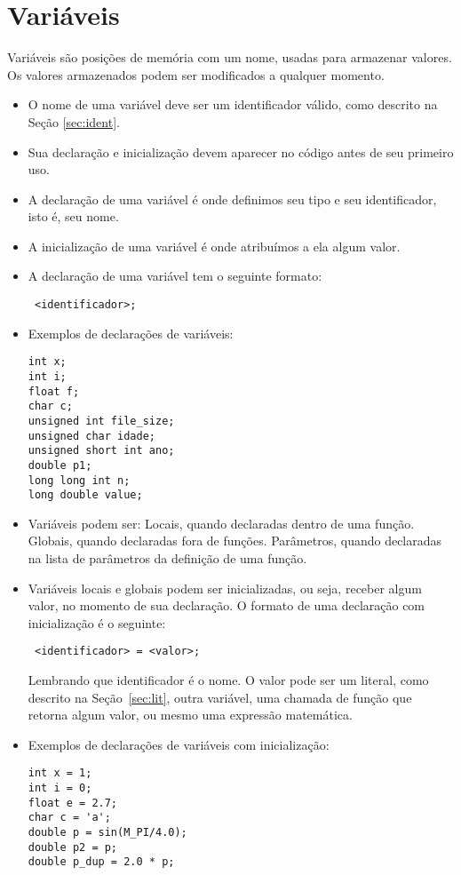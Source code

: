 
\section{Variáveis}

Variáveis são posições de memória com um nome, usadas para armazenar valores. Os valores armazenados podem ser modificados a qualquer momento.

\begin{itemize}
\item O nome de uma variável deve ser um identificador válido, como descrito na Seção \ref{sec:ident}.
\item Sua declaração e inicialização devem aparecer no código antes de seu primeiro uso.
\item A declaração de uma variável é onde definimos seu tipo e seu identificador, isto é, seu nome.
\item A inicialização de uma variável é onde atribuímos a ela algum valor.
\item A declaração de uma variável tem o seguinte formato:

{\tt <tipo de dados> <identificador>;}

\item Exemplos de declarações de variáveis:
\begin{lstlisting}
int x;
int i;
float f;
char c;
unsigned int file_size;
unsigned char idade;
unsigned short int ano;
double p1;
long long int n;
long double value;
\end{lstlisting}


\item Variáveis podem ser:
\subitem Locais, quando declaradas dentro de uma função.
\subitem Globais, quando declaradas fora de funções.
\subitem Parâmetros, quando declaradas na lista de parâmetros da definição de uma função.

\item Variáveis locais e globais podem ser inicializadas, ou seja, receber algum valor, no momento de sua declaração. O formato de uma declaração com inicialização é o seguinte:

{\tt <tipo de dados> <identificador> = <valor>;}

Lembrando que identificador é o nome. O valor pode ser um literal, como descrito na Seção~\ref{sec:lit}, outra variável, uma chamada de função que retorna algum valor, ou mesmo uma expressão matemática.

\item Exemplos de declarações de variáveis com inicialização:
\begin{lstlisting}
int x = 1;
int i = 0;
float e = 2.7;
char c = 'a';
double p = sin(M_PI/4.0);
double p2 = p;
double p_dup = 2.0 * p;
\end{lstlisting}

\end{itemize}

